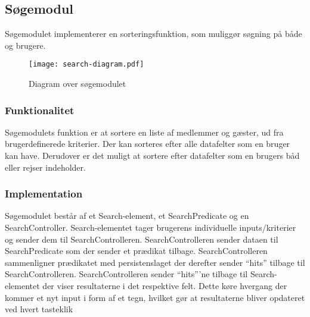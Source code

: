 \subsection{Søgemodul}
\label{sub:s_searchmodul}

Søgemodulet implementerer en sorteringsfunktion, som muliggør søgning på både og brugere.

\begin{figure}
  \centering
  \texttt{[image: search-diagram.pdf]}
  \caption{Diagram over søgemodulet}
\end{figure}
\subsubsection{Funktionalitet}
\label{sub:funktionalitet}

Søgemodulets funktion er at sortere en liste af medlemmer og gæster, ud fra brugerdefinerede kriterier. Der kan sorteres efter alle datafelter som en bruger kan have. Derudover er det muligt at sortere efter datafelter som en brugers båd eller rejser indeholder. 

\subsubsection{Implementation}
\label{sub:implementation}

Søgemodulet består af et Search-element, et SearchPredicate og en SearchController. Search-elementet tager brugerens individuelle inputs/kriterier og sender dem til SearchControlleren. SearchControlleren sender dataen til SearchPredicate som der sender et prædikat tilbage. SearchControlleren sammenligner prædikatet med persistenslaget der derefter sender \enquote{hits} tilbage til SearchControlleren. SearchControlleren sender \enquote{hits}'ne tilbage til Search-elementet der viser resultaterne i det respektive felt. Dette køre hvergang der kommer et nyt input i form af et tegn, hvilket gør at resultaterne bliver opdateret ved hvert tasteklik




